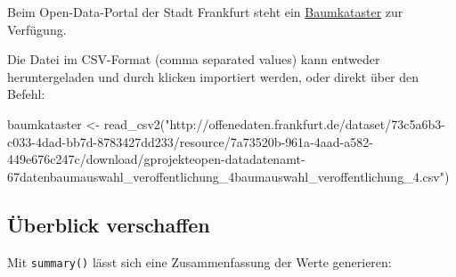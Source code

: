 \documentclass[11pt,german,a4paper]{article}
\newenvironment{Shaded}{\begin{snugshade}}{\end{snugshade}}
\newcommand{\FunctionTok}[1]{\textcolor[rgb]{0.00,0.00,0.00}{#1}}
\newcommand{\NormalTok}[1]{#1}
\newcommand{\OtherTok}[1]{\textcolor[rgb]{0.56,0.35,0.01}{#1}}
\newcommand{\StringTok}[1]{\textcolor[rgb]{0.31,0.60,0.02}{#1}}
\begin{document}
Beim Open-Data-Portal der Stadt Frankfurt steht ein \href{http://offenedaten.frankfurt.de/dataset/baumkataster-frankfurt-am-main}{Baumkataster} zur Verfügung.

Die Datei im CSV-Format (comma separated values) kann entweder heruntergeladen und durch klicken importiert werden, oder direkt über den Befehl:

\begin{Shaded}
\begin{Highlighting}[]
\NormalTok{baumkataster }\OtherTok{\textless{}{-}} \FunctionTok{read\_csv2}\NormalTok{(}\StringTok{"http://offenedaten.frankfurt.de/dataset/73c5a6b3{-}c033{-}4dad{-}bb7d{-}8783427dd233/resource/7a73520b{-}961a{-}4aad{-}a582{-}449e676c247c/download/gprojekteopen{-}datadatenamt{-}67datenbaumauswahl\_veroffentlichung\_4baumauswahl\_veroffentlichung\_4.csv"}\NormalTok{)}
\end{Highlighting}
\end{Shaded}

\hypertarget{uxfcberblick-verschaffen}{%
\subsection{Überblick verschaffen}\label{uxfcberblick-verschaffen}}

Mit \texttt{summary()} lässt sich eine Zusammenfassung der Werte generieren:
\end{document}
